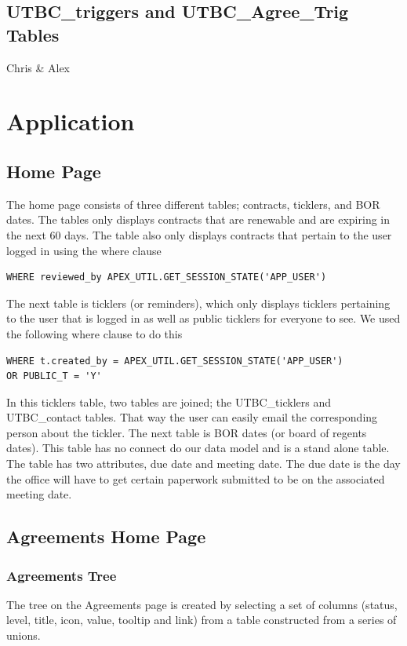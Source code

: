 \documentclass{report}
\begin{document}
\section{UTBC\_triggers and UTBC\_Agree\_Trig Tables}
Chris & Alex

\chapter{Application}

\section{Home Page}
The home page consists of three different tables; contracts, ticklers, and BOR dates. The tables only displays contracts that are renewable and are expiring in the next 60 days. The table also only displays contracts that pertain to the user logged in using the where clause

\begin{lstlisting}[caption=Contracts table where clause for user]
WHERE reviewed_by APEX_UTIL.GET_SESSION_STATE('APP_USER')
\end{lstlisting}

The next table is ticklers (or reminders), which only displays ticklers pertaining to the user that is logged in as well as public ticklers for everyone to see. We used the following where clause to do this

\begin{lstlisting}[caption=Tickler table where clause]
WHERE t.created_by = APEX_UTIL.GET_SESSION_STATE('APP_USER')
OR PUBLIC_T = 'Y'
\end{lstlisting}

In this ticklers table, two tables are joined; the UTBC\_ticklers and UTBC\_contact tables. That way the user can easily email the corresponding person about the tickler. 
The next table is BOR dates (or board of regents dates). This table has no connect do our data model and is a stand alone table. The table has two attributes, due date and meeting date. The due date is the day the office will have to get certain paperwork submitted to be on the associated meeting date.

\section{Agreements Home Page}

\subsection{Agreements Tree}
The tree on the Agreements page is created by selecting a set of columns (status, level, title, icon, value, tooltip and link) from a table constructed from a series of unions.
\end{document}
